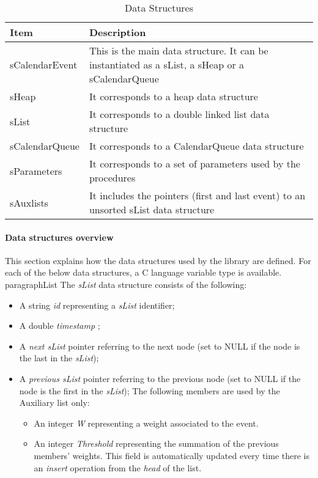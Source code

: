 \begin{table}[]
\centering
\caption{Data Structures}
\label{datastructures}
\begin{tabular}{|l|m{9cm}|}
\hline
Item           & Description                                                                                     \\\hline
sCalendarEvent & This is the main data structure. It can be instantiated as a sList, a sHeap or a sCalendarQueue \\\hline
sHeap          & It corresponds to a heap data structure                                                         \\\hline
sList          & It corresponds to a double linked list data structure                                           \\\hline
sCalendarQueue & It corresponds to a CalendarQueue data structure                                                \\\hline
sParameters    & It corresponds to a set of parameters used by the procedures                                    \\\hline
sAuxlists      & It includes the pointers (first and last event) to an unsorted sList data structure \\\hline          
\end{tabular}
\end{table}

\paragraph{Data structures overview}
This section explains how the data structures used by the library are defined. For each of the below data structures, a C language variable type is available.
paragraph{List}
The \textit{sList} data structure consists of the following:
\begin{itemize}
\item A string \textit{id} representing a \textit{sList} identifier;
\item A double \textit{timestamp} ;
\item A \textit{next sList} pointer referring to the next node (set to NULL if the node is the last in the \textit{sList});
\item A \textit{previous sList} pointer referring to the previous node (set to NULL if the node is the first in the \textit{sList});
The following members are used by the Auxiliary list only:
\begin{itemize}
\item An integer \textit{W} representing a weight associated to the event.
\item An integer \textit{Threshold} representing the summation of the previous members' weights. This field is automatically updated every time there is an \textit{insert} operation from the \textit{head}
of the list.
\end{itemize}
\end{itemize}

